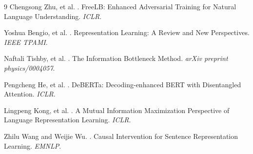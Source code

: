 \documentclass{acmart}
\begin{document}
\begin{thebibliography}{9}
Chengsong Zhu, et al.
.
\newblock FreeLB: Enhanced Adversarial Training for Natural Language Understanding.
\newblock \emph{ICLR}.

Yoshua Bengio, et al.
.
\newblock Representation Learning: A Review and New Perspectives.
\newblock \emph{IEEE TPAMI}.

Naftali Tishby, et al.
.
\newblock The Information Bottleneck Method.
\newblock \emph{arXiv preprint physics/0004057}.

Pengcheng He, et al.
.
\newblock DeBERTa: Decoding-enhanced BERT with Disentangled Attention.
\newblock \emph{ICLR}.

Lingpeng Kong, et al.
.
\newblock A Mutual Information Maximization Perspective of Language Representation Learning.
\newblock \emph{ICLR}.

Zhilu Wang and Weijie Wu.
.
\newblock Causal Intervention for Sentence Representation Learning.
\newblock \emph{EMNLP}.

\end{thebibliography}
\end{document}
